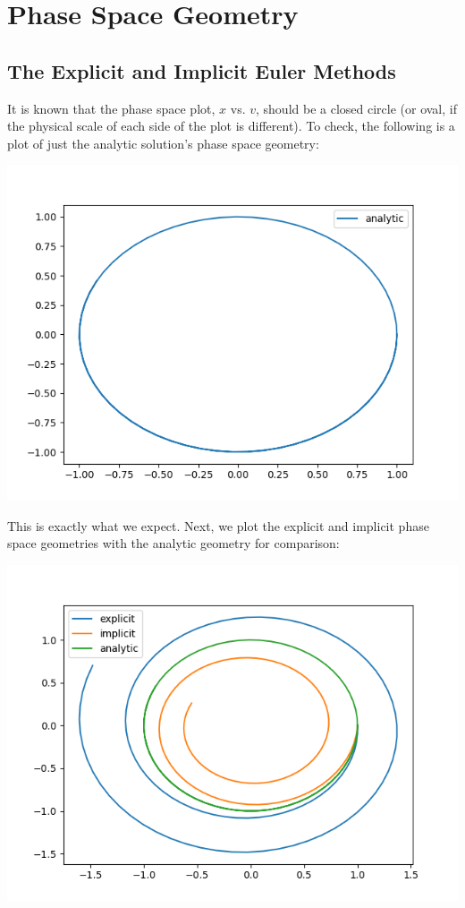 \documentclass{article}
\begin{document}
\section{Phase Space Geometry}
\subsection{The Explicit and Implicit Euler Methods}
It is known that the phase space plot, $x$ vs. $v$, should be a closed circle (or oval, if the physical scale of each side of the plot is different). To check, the following is a plot of just the analytic solution's phase space geometry:

\includegraphics[scale=0.9]{images/analytic_phasespace.png}

This is exactly what we expect. Next, we plot the explicit and implicit phase space geometries with the analytic geometry for comparison:

\includegraphics[scale=0.9]{images/implicit_vs_explicit_vs_analytic_phasespace.png}
\end{document}
